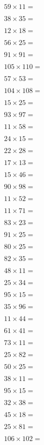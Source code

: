 \documentclass{numbersense}
\begin{document}
\begin{questions}
\q[649] $59 \times 11 = $\ans

\q[1330] $38 \times 35 = $\ans

\q[216] $12 \times 18 = $\ans

\q[1400] $56 \times 25 = $\ans

\q[8281] $91 \times 91 = $\ans

\q[11550] $105 \times 110 = $\ans

\q[3021] $57 \times 53 = $\ans

\q[11232] $104 \times 108 = $\ans

\q[375] $15 \times 25 = $\ans

\q[9021] $93 \times 97 = $\ans

\q[638] $11 \times 58 = $\ans

\q[360] $24 \times 15 = $\ans

\q[616] $22 \times 28 = $\ans

\q[221] $17 \times 13 = $\ans

\q[690] $15 \times 46 = $\ans

\q[8820] $90 \times 98 = $\ans

\q[572] $11 \times 52 = $\ans

\q[781] $11 \times 71 = $\ans

\q[1909] $83 \times 23 = $\ans

\q[2275] $91 \times 25 = $\ans

\q[2000] $80 \times 25 = $\ans

\q[2870] $82 \times 35 = $\ans

\q[528] $48 \times 11 = $\ans

\q[850] $25 \times 34 = $\ans

\q[1425] $95 \times 15 = $\ans

\q[3360] $35 \times 96 = $\ans

\q[484] $11 \times 44 = $\ans

\q[2501] $61 \times 41 = $\ans

\q[803] $73 \times 11 = $\ans

\q[2050] $25 \times 82 = $\ans

\q[1250] $50 \times 25 = $\ans

\q[418] $38 \times 11 = $\ans

\q[1425] $95 \times 15 = $\ans

\q[1216] $32 \times 38 = $\ans

\q[810] $45 \times 18 = $\ans

\q[2025] $25 \times 81 = $\ans

\q[10812] $106 \times 102 = $\ans


\end{questions}
\end{document}
